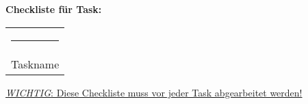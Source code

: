 \documentclass[11pt]{article}
\begin{document}
\begin{center}
\textbf{\Huge Checkliste f\"ur Task:}\\
\vspace{1cm}
\begin{center}

\begin{tabular}{@{}l@{}}\rule{10cm}{0.01cm}\\
\hspace{4cm}Taskname
\end{tabular}
\end{center}
\end{center}
\underline{\textit{WICHTIG}: Diese Checkliste muss vor jeder Task abgearbeitet werden!}
\end{document}
